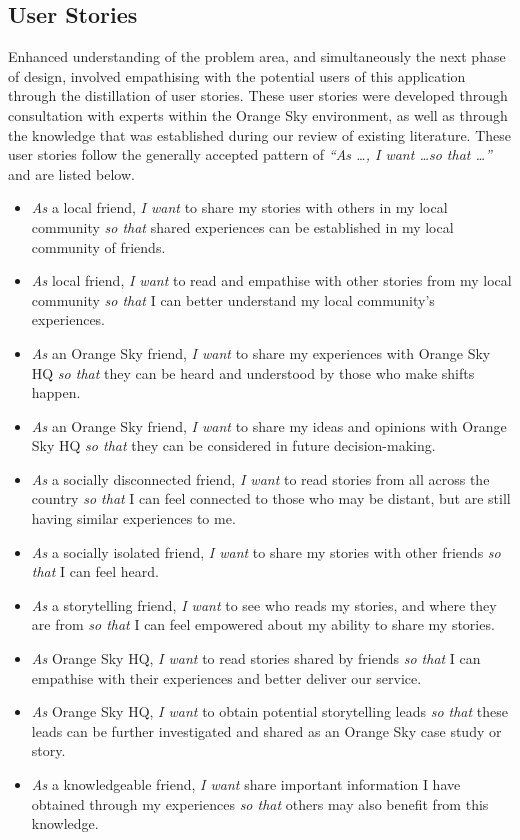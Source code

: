 \clearpage

\subsection{User Stories}

Enhanced understanding of the problem area, and simultaneously the next phase of design, involved empathising with the potential users of this application through the distillation of user stories.
These user stories were developed through consultation with experts within the Orange Sky environment, as well as through the knowledge that was established during our review of existing literature.
These user stories follow the generally accepted pattern of \emph{“As \dots, I want \dots so that \dots”} and are listed below.

\begin{itemize}
    \item \emph{As} a local friend, \emph{I want} to share my stories with others in my local community \emph{so that} shared experiences can be established in my local community of friends.
    \item \emph{As} local friend, \emph{I want} to read and empathise with other stories from my local community \emph{so that} I can better understand my local community's experiences.
    \item \emph{As} an Orange Sky friend, \emph{I want} to share my experiences with Orange Sky HQ \emph{so that} they can be heard and understood by those who make shifts happen.
    \item \emph{As} an Orange Sky friend, \emph{I want} to share my ideas and opinions with Orange Sky HQ \emph{so that} they can be considered in future decision-making.
    \item \emph{As} a socially disconnected friend, \emph{I want} to read stories from all across the country \emph{so that} I can feel connected to those who may be distant, but are still having similar experiences to me.
    \item \emph{As} a socially isolated friend, \emph{I want} to share my stories with other friends \emph{so that} I can feel heard.
    \item \emph{As} a storytelling friend, \emph{I want} to see who reads my stories, and where they are from \emph{so that} I can feel empowered about my ability to share my stories.
    \item \emph{As} Orange Sky HQ, \emph{I want} to read stories shared by friends \emph{so that} I can empathise with their experiences and better deliver our service.
    \item \emph{As} Orange Sky HQ, \emph{I want} to obtain potential storytelling leads \emph{so that} these leads can be further investigated and shared as an Orange Sky case study or story.
    \item \emph{As} a knowledgeable friend, \emph{I want} share important information I have obtained through my experiences \emph{so that} others may also benefit from this knowledge.
\end{itemize}

